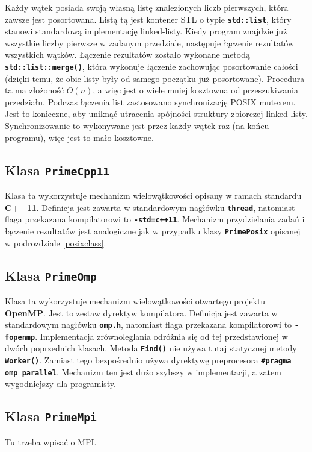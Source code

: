 \documentclass[12pt, twoside, hidelinks, a4paper]{article}
\begin{document}
Każdy wątek posiada swoją własną listę znalezionych liczb pierwszych, która zawsze jest posortowana. Listą tą jest kontener STL o typie \textbf{\texttt{std::list}}, który stanowi  standardową implementację linked-listy. Kiedy program znajdzie już wszystkie liczby pierwsze w zadanym przedziale, następuje łączenie rezultatów wszystkich wątków. Łączenie rezultatów zostało wykonane metodą \textbf{\texttt{std::list::merge()}}, która wykonuje łączenie zachowując posortowanie całości (dzięki temu, że obie listy były od samego początku już posortowane). Procedura ta ma złożoność $O(n)$, a więc jest o wiele mniej kosztowna od przeszukiwania przedziału. Podczas łączenia list zastosowano synchronizację POSIX mutexem. Jest to konieczne, aby uniknąć utracenia spójności struktury zbiorczej linked-listy. Synchronizowanie to wykonywane jest przez każdy wątek raz (na końcu programu), więc jest to mało kosztowne.

\subsection{Klasa \textbf{\texttt{PrimeCpp11}}}
Klasa ta wykorzystuje mechanizm wielowątkowości opisany w ramach standardu \textbf{C++11}. Definicja jest zawarta w standardowym nagłówku \textbf{\texttt{thread}}, natomiast flaga przekazana kompilatorowi to \textbf{\texttt{-std=c++11}}. Mechanizm przydzielania zadań i łączenie rezultatów jest analogiczne jak w przypadku klasy \textbf{\texttt{PrimePosix}} opisanej w podrozdziale \ref{posixclass}.

\subsection{Klasa \textbf{\texttt{PrimeOmp}}}
Klasa ta wykorzystuje mechanizm wielowątkowości otwartego projektu \textbf{OpenMP}. Jest to zestaw dyrektyw kompilatora. Definicja jest zawarta w standardowym nagłówku \textbf{\texttt{omp.h}}, natomiast flaga przekazana kompilatorowi to \textbf{\texttt{-fopenmp}}. Implementacja zrównoleglania odróżnia się od tej przedstawionej w dwóch poprzednich klasach. Metoda \textbf{\texttt{Find()}} nie używa tutaj statycznej metody \textbf{\texttt{Worker()}}. Zamiast tego bezpośrednio używa dyrektywę preprocesora \textbf{\texttt{\#pragma omp parallel}}. Mechanizm ten jest dużo szybszy w implementacji, a zatem wygodniejszy dla programisty.

\subsection{Klasa \textbf{\texttt{PrimeMpi}}}
Tu trzeba wpisać o MPI.
\end{document}
